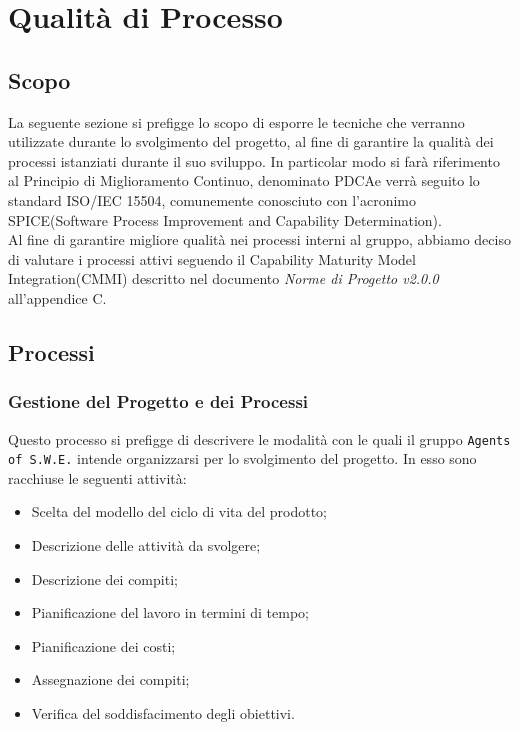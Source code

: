 \section{Qualità di Processo}
\label{qualitaProcesso}

\subsection{Scopo}

La seguente sezione si prefigge lo scopo di esporre le tecniche che verranno utilizzate durante lo svolgimento del progetto, al fine di garantire la qualità dei processi istanziati durante il suo sviluppo. In particolar modo si farà riferimento al Principio di Miglioramento Continuo, denominato PDCA\glossario e verrà seguito lo standard ISO/IEC 15504, comunemente conosciuto con l'acronimo SPICE\glossario (Software Process Improvement and Capability Determination).\\
Al fine di garantire migliore qualità nei processi interni al gruppo, abbiamo deciso di valutare i processi attivi seguendo il Capability Maturity Model Integration(CMMI) descritto nel documento \textit{Norme di Progetto v2.0.0} all'appendice C.

\subsection{Processi}
\subsubsection{Gestione del Progetto e dei Processi} 

Questo processo si prefigge di descrivere le modalità con le quali il gruppo \texttt{Agents of S.W.E.} intende organizzarsi per lo svolgimento del progetto. In esso sono racchiuse le seguenti attività:
\begin{itemize}
	\item Scelta del modello del ciclo di vita del prodotto;
	\item Descrizione delle attività da svolgere;
	\item Descrizione dei compiti;
	\item Pianificazione del lavoro in termini di tempo;
	\item Pianificazione dei costi;
	\item Assegnazione dei compiti;
	\item Verifica del soddisfacimento degli obiettivi.
\end{itemize}

